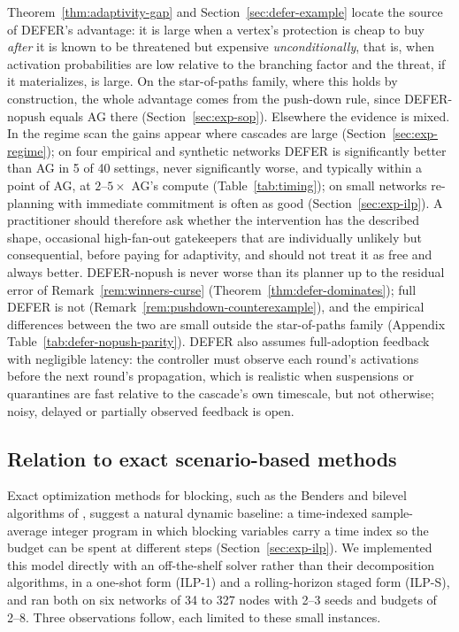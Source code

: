 \documentclass[11pt]{article}
\theoremstyle{definition}
\theoremstyle{remark}
\begin{document}
Theorem~\ref{thm:adaptivity-gap} and Section~\ref{sec:defer-example} locate the source of DEFER's advantage: it is large when a vertex's protection is cheap to buy \emph{after} it is known to be threatened but expensive \emph{unconditionally}, that is, when activation probabilities are low relative to the branching factor and the threat, if it materializes, is large. On the star-of-paths family, where this holds by construction, the whole advantage comes from the push-down rule, since DEFER-nopush equals AG there (Section~\ref{sec:exp-sop}). Elsewhere the evidence is mixed. In the regime scan the gains appear where cascades are large (Section~\ref{sec:exp-regime}); on four empirical and synthetic networks DEFER is significantly better than AG in 5 of 40 settings, never significantly worse, and typically within a point of AG, at $2$--$5\times$ AG's compute (Table~\ref{tab:timing}); on small networks re-planning with immediate commitment is often as good (Section~\ref{sec:exp-ilp}). A practitioner should therefore ask whether the intervention has the described shape, occasional high-fan-out gatekeepers that are individually unlikely but consequential, before paying for adaptivity, and should not treat it as free and always better. DEFER-nopush is never worse than its planner up to the residual error of Remark~\ref{rem:winners-curse} (Theorem~\ref{thm:defer-dominates}); full DEFER is not (Remark~\ref{rem:pushdown-counterexample}), and the empirical differences between the two are small outside the star-of-paths family (Appendix Table~\ref{tab:defer-nopush-parity}). DEFER also assumes full-adoption feedback with negligible latency: the controller must observe each round's activations before the next round's propagation, which is realistic when suspensions or quarantines are fast relative to the cascade's own timescale, but not otherwise; noisy, delayed or partially observed feedback is open.

\subsection{Relation to exact scenario-based methods}\label{sec:discussion-exact}

Exact optimization methods for blocking, such as the Benders and bilevel
algorithms of \citet{taninmis2022,taninmis2024}, suggest a natural dynamic
baseline: a time-indexed sample-average integer program in which blocking
variables carry a time index so the budget can be spent at different steps
(Section~\ref{sec:exp-ilp}). We implemented this model directly with an
off-the-shelf solver rather than their decomposition algorithms, in a one-shot
form (ILP-1) and a rolling-horizon staged form (ILP-S),
and ran both on six networks of 34 to 327 nodes with 2--3 seeds and budgets of
2--8. Three observations follow, each limited to these small instances.
\end{document}
